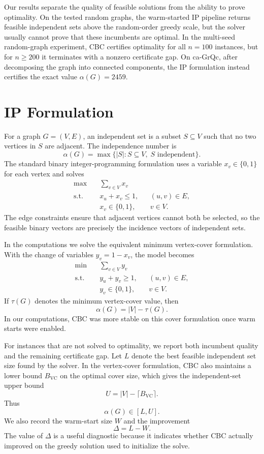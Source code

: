 \documentclass[11pt]{article}
\begin{document}
Our results separate the quality of feasible solutions from the ability to
prove optimality.  On the tested random graphs, the warm-started IP pipeline
returns feasible independent sets above the random-order greedy scale, but the
solver usually cannot prove that these incumbents are optimal.  In the
multi-seed random-graph experiment, CBC certifies optimality for all $n=100$
instances, but for $n\ge 200$ it terminates with a nonzero certificate gap.  On
ca-GrQc, after decomposing the graph into connected components, the IP
formulation instead certifies the exact value $\alpha(G)=2459$.

\section{IP Formulation}

For a graph $G=(V,E)$, an independent set is a subset $S\subseteq V$ such that
no two vertices in $S$ are adjacent.  The independence number is
\[
\alpha(G)=\max\{|S|: S\subseteq V,\; S\text{ independent}\}.
\]
The standard binary integer-programming formulation uses a variable
$x_v\in\{0,1\}$ for each vertex and solves
\[
\begin{aligned}
\max \quad & \sum_{v\in V}x_v\\
\text{s.t.}\quad & x_u+x_v\le 1, && (u,v)\in E,\\
& x_v\in\{0,1\}, && v\in V.
\end{aligned}
\]
The edge constraints ensure that adjacent vertices cannot both be selected, so
the feasible binary vectors are precisely the incidence vectors of independent
sets.

In the computations we solve the equivalent minimum vertex-cover formulation.
With the change of variables $y_v=1-x_v$, the model becomes
\[
\begin{aligned}
\min \quad & \sum_{v\in V}y_v\\
\text{s.t.}\quad & y_u+y_v\ge 1, && (u,v)\in E,\\
& y_v\in\{0,1\}, && v\in V.
\end{aligned}
\]
If $\tau(G)$ denotes the minimum vertex-cover value, then
\[
\alpha(G)=|V|-\tau(G).
\]
In our computations, CBC was more stable on this cover formulation once warm starts
were enabled.

For instances that are not solved to optimality, we report both incumbent
quality and the remaining certificate gap.  Let $L$ denote the best feasible
independent set size found by the solver.  In the vertex-cover formulation,
CBC also maintains a lower bound $B_{\mathrm{VC}}$ on the optimal cover size,
which gives the independent-set upper bound
\[
U=|V|-\lceil B_{\mathrm{VC}}\rceil.
\]
Thus
\[
\alpha(G)\in[L,U].
\]
We also record the warm-start size $W$ and the improvement
\[
\Delta=L-W.
\]
The value of $\Delta$ is a useful diagnostic because it indicates whether CBC actually
improved on the greedy solution used to initialize the solve.
\end{document}
